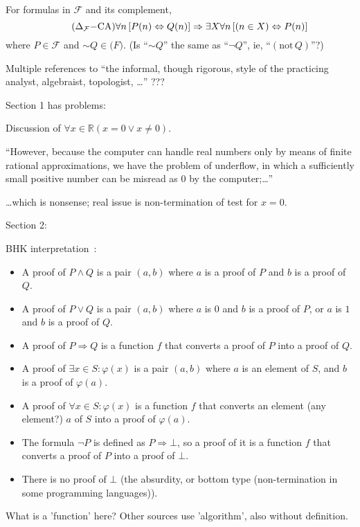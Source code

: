 For formulas in $\mathcal{F}$ and its complement,
\begin{equation}
\tag{$\Delta_{\mathcal{F}}{-}\text{CA}$}
\forall n \left[ P(n) \Leftrightarrow Q(n) \right]
\Rightarrow 
\exists X \forall n \left[ (n \in X) \Leftrightarrow P(n) \right]
\end{equation}
where $P \in \mathcal{F}$ and $\sim Q \in \mathcal(F)$.
\textsf{
(Is ``$\sim Q$'' the same as ``$\lnot Q$'', ie, 
``$(\text{not}\, Q)$''?)}

\label{sec:Constructivism_SEP}
\cite{sep:mathematics_constructive}

Multiple references to ``the informal, though rigorous, 
style of the practicing analyst, algebraist, topologist, \ldots''
???

Section 1 has problems:

Discussion of
$ \forall x \in \mathbb{R} (x = 0 \vee x \ne 0)$.

``However, because the computer can handle real numbers 
only by means of finite rational approximations, 
we have the problem of underflow, 
in which a sufficiently small positive number can be misread as 0 
by the computer;\ldots''

\ldots which is nonsense;
real issue is non-termination of test for $x=0$.

Section 2:

BHK interpretation~\cite{wiki:Brouwer_Heyting_Kolmogorov_interpretation}:
\begin{itemize}
  \item A proof of $P\wedge Q$ 
  is a pair $(a,b)$ where $a$ is a proof of $P$ 
  and $b$ is a proof of $Q$.
\item A proof of $P\vee Q$ is a pair $(a,b)$ 
where $a$ is $0$ and 
$b$ is a proof of $P$, 
or $a$ is $1$ 
and $b$ is a proof of $Q$.
\item A proof of $P\Rightarrow Q$ is 
a function $f$ that converts 
a proof of $P$ into a proof of $Q$.
\item A proof of $\exists x\in S:\varphi (x)$ is 
a pair $(a,b)$ where 
$a$ is an element of $S$, 
and $b$ is a proof of $\varphi (a)$.
\item A proof of $\forall x\in S:\varphi (x)$ is 
a function $f$ that converts 
an element (any element?) $a$ of $S$ into a proof of $\varphi (a)$.
\item The formula $\neg P$ is defined as $P\Rightarrow \bot$, 
so a proof of it is a function $f$ that converts 
a proof of $P$ into a proof of $\bot$.
\item There is no proof of $\bot$
(the absurdity, or bottom type 
(non-termination in some programming languages)).
\end{itemize}
What is a 'function' here? 
Other sources use 'algorithm', also without definition.

